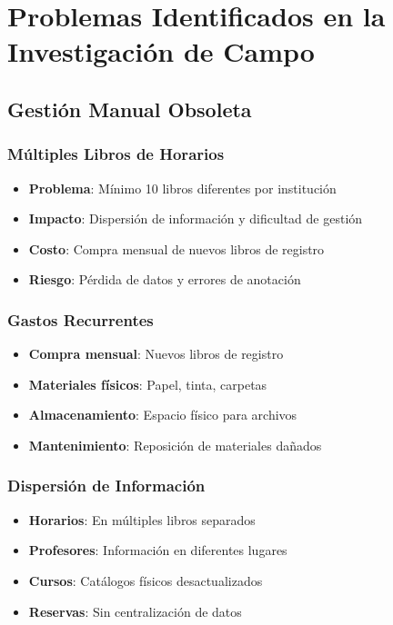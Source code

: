 \documentclass[12pt,a4paper]{article}
\begin{document}
\section{Problemas Identificados en la Investigación de Campo}

\subsection{Gestión Manual Obsoleta}

\subsubsection{Múltiples Libros de Horarios}
\begin{itemize}
    \item \textbf{Problema}: Mínimo 10 libros diferentes por institución
    \item \textbf{Impacto}: Dispersión de información y dificultad de gestión
    \item \textbf{Costo}: Compra mensual de nuevos libros de registro
    \item \textbf{Riesgo}: Pérdida de datos y errores de anotación
\end{itemize}

\subsubsection{Gastos Recurrentes}
\begin{itemize}
    \item \textbf{Compra mensual}: Nuevos libros de registro
    \item \textbf{Materiales físicos}: Papel, tinta, carpetas
    \item \textbf{Almacenamiento}: Espacio físico para archivos
    \item \textbf{Mantenimiento}: Reposición de materiales dañados
\end{itemize}

\subsubsection{Dispersión de Información}
\begin{itemize}
    \item \textbf{Horarios}: En múltiples libros separados
    \item \textbf{Profesores}: Información en diferentes lugares
    \item \textbf{Cursos}: Catálogos físicos desactualizados
    \item \textbf{Reservas}: Sin centralización de datos
\end{itemize}
\end{document}

